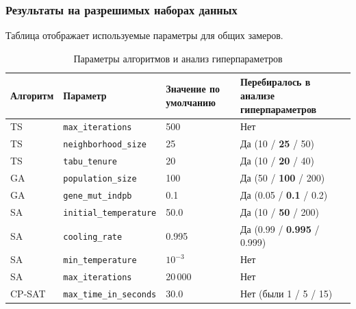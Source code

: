 \subsubsection { Результаты на разрешимых наборах данных}

Таблица отображает используемые параметры для общих замеров.
\begin{table}[h]
    \centering
    \caption{Параметры алгоритмов и анализ гиперпараметров}
    \label{tab:hyperparameters}

    \begin{tabular}{|l|l|p{4cm}|p{5cm}|}
        \hline
        \textbf{Алгоритм} &
        \textbf{Параметр} &
        \textbf{Значение по умолчанию} &
        \textbf{Перебиралось в анализе гиперпараметров} \\
        \hline

        TS & \texttt{max\_iterations} & 500 & Нет \\
        \hline

        TS & \texttt{neighborhood\_size} & 25 & Да (10 / \textbf{25} / 50) \\
        \hline

        TS & \texttt{tabu\_tenure} & 20 & Да (10 / \textbf{20} / 40) \\
        \hline

        GA & \texttt{population\_size} & 100 & Да (50 / \textbf{100} / 200) \\
        \hline

        GA & \texttt{gene\_mut\_indpb} & 0.1 & Да (0.05 / \textbf{0.1} / 0.2) \\
        \hline

        SA & \texttt{initial\_temperature} & 50.0 & Да (10 / \textbf{50} / 200) \\
        \hline

        SA & \texttt{cooling\_rate} & 0.995 & Да (0.99 / \textbf{0.995} / 0.999) \\
        \hline

        SA & \texttt{min\_temperature} & $10^{-3}$ & Нет \\
        \hline

        SA & \texttt{max\_iterations} & 20\,000 & Нет \\
        \hline

        CP-SAT & \texttt{max\_time\_in\_seconds} & 30.0 & Нет (были 1 / 5 / 15) \\
        \hline

    \end{tabular}
\end{table}

